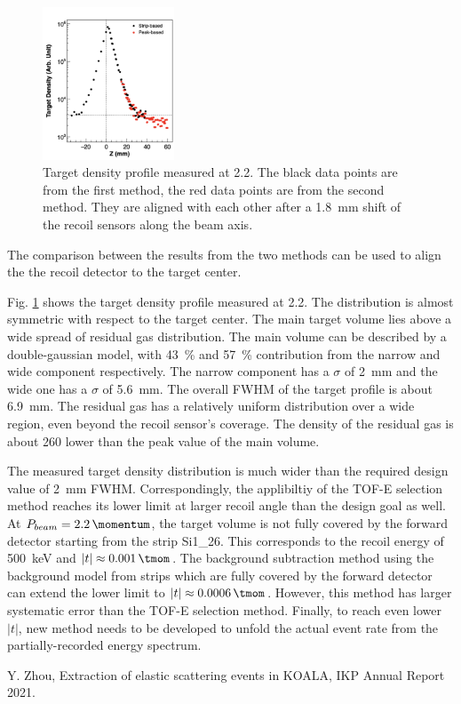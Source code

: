 \documentclass[fleqn,twocolumn,a4paper]{ikpar}
\begin{document}
\begin{figure}[t!]
  \centering
	\includegraphics[width=0.35\textwidth]{./target_density_result.png}
  \caption{Target density profile measured at \SI{2.2}{\momentum}. The black
    data points are from the first method, the red data points are from the
    second method. They are aligned with each other after a \SI{1.8}{\mm} shift of
    the recoil sensors along the beam axis.}
  \label{fig:target_density_result}
\end{figure}
The comparison between the results from the two methods can be used to align the the recoil detector to the target center.

\par
\medskip

Fig. \ref{fig:target_density_result} shows the target density profile measured at
\SI{2.2}{\momentum}.
The distribution is almost symmetric with respect to the target center.
The main target volume lies above a wide spread of residual gas distribution.
The main volume can be described by a double-gaussian model, with
\SI{43}{\percent} and \SI{57}{\percent} contribution from the narrow and wide
component respectively.
The narrow component has a $\sigma$ of \SI{2}{mm} and the wide one has a $\sigma$ of \SI{5.6}{mm}.
The overall FWHM of the target profile is about \SI{6.9}{mm}.
The residual gas has a relatively uniform distribution over a wide region, even
beyond the recoil sensor's coverage.
The density of the residual gas is about 260 lower than the peak value of the
main volume.

\par
\medskip

The measured target density distribution is much wider than the required design value
of \SI{2}{\mm} FWHM.
Correspondingly, the applibiltiy of the TOF-E selection method reaches its lower
limit at larger recoil angle than the design goal as well.
At $P_{beam}=\SI{2.2}{\momentum}$, the target volume is not fully covered by
the forward detector starting from the strip Si1\_26.
This corresponds to the recoil energy of \SI{500}{\keV} and $|t| \approx \SI{0.001}{\tmom}$.
The background subtraction method using the background model from strips which
are fully covered by the forward detector can extend the lower limit to $|t| \approx \SI{0.0006}{\tmom}$.
However, this method has larger systematic error than the TOF-E selection method.
Finally, to reach even lower $|t|$, new method needs to be developed to unfold the
actual event rate from the partially-recorded energy spectrum.

\par
\medskip

\begin{thebibliography}{99}
 Y. Zhou, Extraction of elastic scattering events in KOALA, IKP Annual Report 2021.
\end{thebibliography}
\end{document}
